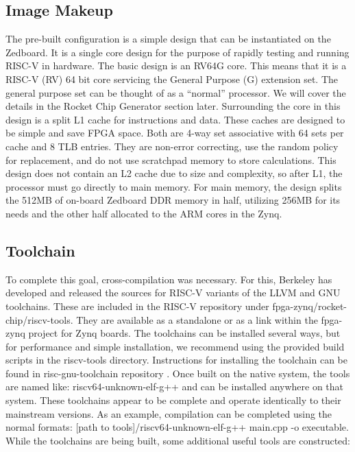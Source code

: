 \documentclass[journal]{IEEEtran}
\begin{document}
\subsection{Image Makeup}
The pre-built configuration is a simple design that can be instantiated on the Zedboard. It is a single core design for the purpose of rapidly testing and running RISC-V in hardware. The basic design is an RV64G core. This means that it is a RISC-V (RV) 64 bit core servicing the General Purpose (G) extension set. The general purpose set can be thought of as a ``normal'' processor. We will cover the details in the Rocket Chip Generator section later. \newline
Surrounding the core in this design is a split L1 cache for instructions and data. These caches are designed to be simple and save FPGA space. Both are 4-way set associative with 64 sets per cache and 8 TLB entries. They are non-error correcting, use the random policy for replacement, and do not use scratchpad memory to store calculations. \newline
This design does not contain an L2 cache due to size and complexity, so after L1, the processor must go directly to main memory. For main memory, the design splits the 512MB of on-board Zedboard DDR memory in half, utilizing 256MB for its needs and the other half allocated to the ARM cores in the Zynq.

\subsection{Toolchain}
To complete this goal, cross-compilation was necessary. For this, Berkeley has developed and released the sources for RISC-V variants of the LLVM and GNU toolchains. These are included in the RISC-V repository under fpga-zynq/rocket-chip/riscv-tools. They are available as a standalone or as a link within the fpga-zynq project for Zynq boards. The toolchains can be installed several ways, but for performance and simple installation, we recommend using the provided build scripts in the riscv-tools directory. Instructions for installing the toolchain can be found in risc-gnu-toolchain repository \cite{toolchain}. Once built on the native system, the tools are named like: riscv64-unknown-elf-g++ and can be installed anywhere on that system. These toolchains appear to be complete and operate identically to their mainstream versions. As an example, compilation can be completed using the normal formats: [path to tools]/riscv64-unknown-elf-g++ main.cpp -o executable. \newline \newline While the toolchains are being built, some additional useful tools are constructed:\newline
\end{document}
